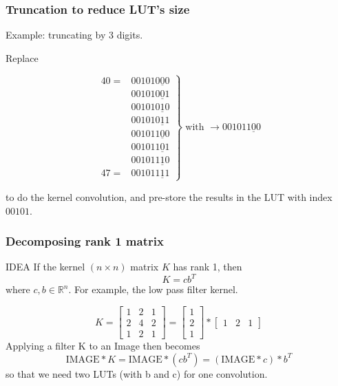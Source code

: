 \documentclass{beamer}
\begin{document}
\begin{frame}
\frametitle{Truncation to reduce LUT's size}
Example: truncating by 3 digits.

Replace 

\[
\left.
\begin{matrix}
 40 = &00101\underline{000}\\
 &00101\underline{001}\\
 &00101\underline{010}\\
 &00101\underline{011}\\
 &00101\underline{100}\\
 &00101\underline{101}\\
 &00101\underline{110}\\
 47 = &00101\underline{111} 
 \end{matrix}
\right\}
\text{ with }\longrightarrow
00101\underline{100}
\]

to do the kernel convolution, and pre-store the results in the LUT with index $00101$.

\end{frame}




\begin{frame}
\frametitle{Decomposing rank 1 matrix}

\begin{beamerboxesrounded}[lower=eeks2,upper=eecks,
shadow=true]{IDEA}
If the kernel $(n\times n)$ matrix $K$ has rank 1, then %
$$
K=cb^T
$$
where $c,b\in \mathbb{R}^n$. For example, the low pass filter kernel.
\end{beamerboxesrounded}
$$
K=
\begin{bmatrix}
1 & 2 & 1\\
2 & 4 & 2\\
1 & 2 & 1
\end{bmatrix}
=
\begin{bmatrix}
1 \\
2 \\
1 
\end{bmatrix}
*
\begin{bmatrix}
1 & 2 & 1
\end{bmatrix}
$$
Applying a filter K to an Image then becomes
$$\text{IMAGE}*K=\text{IMAGE}*(cb^T)=(\text{IMAGE}*c)*b^T
$$
so that we need two LUTs (with b and c) for one convolution.
 \end{frame}
\end{document}
